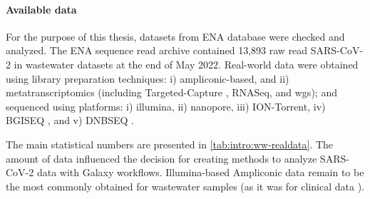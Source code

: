             \paragraph{Available data}
            For the purpose of this thesis, datasets from ENA database \cite{ena} were checked and analyzed. The ENA sequence read archive contained 13,893 raw read SARS-CoV-2 in wastewater datasets at the end of May 2022. Real-world data were obtained using library preparation techniques: i) ampliconic-based, and ii) metatranscriptomics (including Targeted-Capture \cite{critschristoph}, RNASeq, and \acrfull{wgs}); and sequenced using platforms: i) \acrshort{illumina}, ii) \acrshort{nanopore}, iii) ION-Torrent, iv) BGISEQ \cite{fang2018}, and v) DNBSEQ \cite{rao2020}.

            The main statistical numbers are presented in \cref{tab:intro:ww-realdata}. The amount of data influenced the decision for creating methods to analyze SARS-CoV-2 data with Galaxy workflows. Illumina-based Ampliconic data remain to be the most commonly obtained for wastewater samples (as it was for clinical data \cite{maier2021b}).
            
